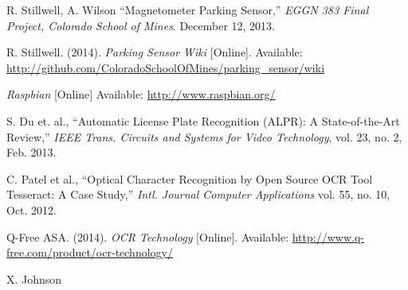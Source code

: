 \documentclass[11pt, oneside, fullpage, doublespace]{article}
\begin{document}
\begin{thebibliography}{99}
 R. Stillwell, A. Wilson ``Magnetometer Parking Sensor,'' \emph{EGGN 383 Final Project, Colorado School of Mines}. December 12, 2013.

 R. Stillwell. (2014). \emph{Parking Sensor Wiki} [Online]. Available: \url{http://github.com/ColoradoSchoolOfMines/parking_sensor/wiki}

 \emph{Raspbian} [Online] Available: \url{http://www.raspbian.org/}

 S. Du et. al., ``Automatic License Plate Recognition (ALPR): A State-of-the-Art Review,'' \emph{IEEE Trans. Circuits and Systems for Video Technology}, vol. 23, no. 2, Feb. 2013.

 C. Patel et al., ``Optical Character Recognition by Open Source OCR Tool Tesseract: A Case Study,'' \emph{Intl. Journal Computer Applications} vol. 55, no. 10, Oct. 2012.

 Q-Free ASA. (2014). \emph{OCR Technology} [Online]. Available: \url{http://www.q-free.com/product/ocr-technology/}

 X. Johnson

\end{thebibliography}
\end{document}
